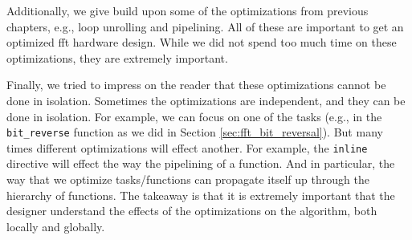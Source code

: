 Additionally, we give build upon some of the optimizations from previous chapters, e.g., loop unrolling and pipelining. All of these are important to get an optimized \gls{fft} hardware design. While we did not spend too much time on these optimizations, they are extremely important.

Finally, we tried to impress on the reader that these optimizations cannot be done in isolation. Sometimes the optimizations are independent, and they can be done in isolation. For example, we can focus on one of the tasks (e.g., in the \lstinline{bit_reverse} function as we did in Section \ref{sec:fft_bit_reversal}). But many times different optimizations will effect another. For example, the \lstinline{inline} directive will effect the way the pipelining of a function. And in particular, the way that we optimize tasks/functions can propagate itself up through the hierarchy of functions.  The takeaway is that it is extremely important that the designer understand the effects of the optimizations on the algorithm, both locally and globally.
